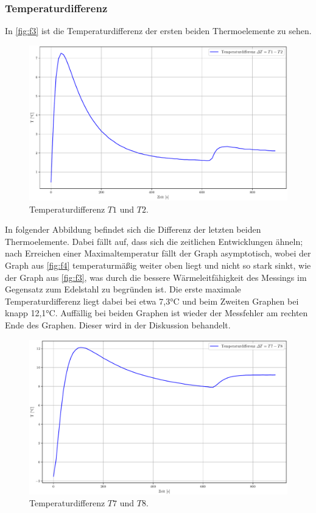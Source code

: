 \subsubsection{Temperaturdifferenz}
In \autoref{fig:f3} ist die Temperaturdifferenz der ersten beiden Thermoelemente 
zu sehen.
\begin{figure}[H]
  \centering
  \includegraphics[width=\textwidth]{plotdiff12.pdf}
  \caption{Temperaturdifferenz $T1$ und $T2$.}
  \label{fig:f3}
\end{figure}
\noindent In folgender Abbildung befindet sich die Differenz der letzten beiden Thermoelemente.
Dabei fällt auf, dass sich die zeitlichen Entwicklungen ähneln; nach Erreichen 
einer Maximaltemperatur fällt der Graph asymptotisch, wobei der Graph aus 
\autoref{fig:f4} temperaturmäßig weiter oben liegt und nicht so stark sinkt, wie 
der Graph aus \autoref{fig:f3}, was durch die bessere Wärmeleitfähigkeit des Messings 
im Gegensatz zum Edelstahl zu begründen ist. Die erste maximale
Temperaturdifferenz liegt dabei bei etwa 7,3°C und beim Zweiten Graphen bei 
knapp 12,1°C. Auffällig bei beiden Graphen ist wieder der Messfehler am rechten
Ende des Graphen. Dieser wird in der Diskussion behandelt. 
\begin{figure}[H]
  \centering
  \includegraphics[width=\textwidth]{plotdiff78.pdf}
  \caption{Temperaturdifferenz $T7$ und $T8$.}
  \label{fig:f4}
\end{figure}



